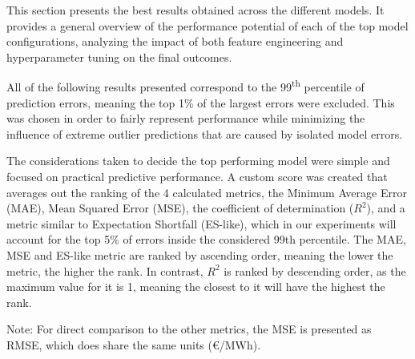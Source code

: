 \documentclass[12pt]{report} %
\begin{document}
This section presents the best results obtained across the different models. It provides a general overview of the performance potential of each of the top model configurations, analyzing the impact of both feature engineering and hyperparameter tuning on the final outcomes.

All of the following results presented correspond to the 99\textsuperscript{th} percentile of prediction errors, meaning the top 1\% of the largest errors were excluded. This was chosen in order to fairly represent performance while minimizing the influence of extreme outlier predictions that are caused by isolated model errors.

The considerations taken to decide the top performing model were simple and focused on practical predictive performance. A custom score was created that averages out the ranking of the 4 calculated metrics, the Minimum Average Error (MAE), Mean Squared Error (MSE), the coefficient of determination ($R^2$), and a metric similar to Expectation Shortfall (ES-like), which in our experiments will account for the top 5\% of errors inside the considered 99th percentile. The MAE, MSE and ES-like metric are ranked by ascending order, meaning the lower the metric, the higher the rank. In contrast, $R^2$ is ranked by descending order, as the maximum value for it is 1, meaning the closest to it will have the highest the rank.

Note: For direct comparison to the other metrics, the MSE is presented as RMSE, which does share the same units (€/MWh).







\end{document}
